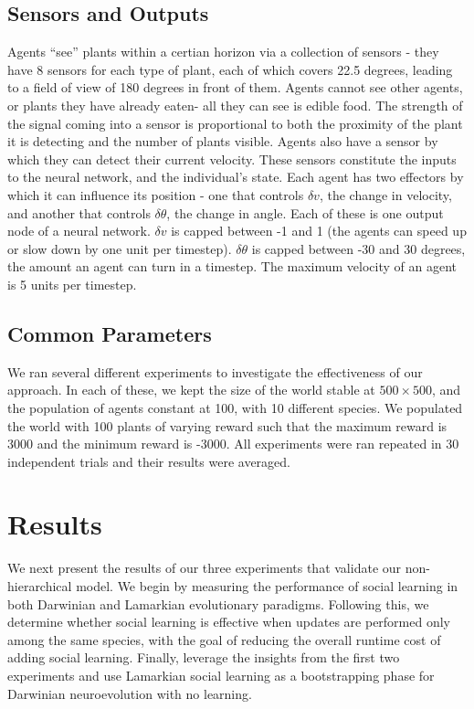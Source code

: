 \documentclass{acm_proc_article-sp}
\begin{document}
\subsection*{Sensors and Outputs} 
  Agents ``see'' plants within a certian horizon via a collection of sensors - they have 8 sensors for each type of plant, each of which covers 22.5 degrees, leading to a field of view of 180 degrees in front of them.  Agents cannot see other agents, or plants they have already eaten- all they can see is edible food.  The strength of the signal coming into a sensor is proportional to both the proximity of the plant it is detecting and the number of plants visible.
   Agents also have a sensor by which they can detect their current velocity. These sensors constitute the inputs to the neural network, and the individual's state. Each agent has two effectors by which it can influence its position - one that controls $\delta v$, the change in velocity, and another that controls $\delta \theta$, the change in angle.
Each of these is one output node of a neural network. $\delta v$ is capped between -1 and 1 (the agents can speed up or slow down by one unit per timestep).  $\delta \theta$ is capped between -30 and 30 degrees, the amount an agent can turn in a timestep.  The maximum velocity of an agent is 5 units per timestep.

\subsection*{Common Parameters} 
We ran several different experiments to investigate the effectiveness of our approach.
In each of these, we kept the size of the world stable at $500\times500$, and the population of agents constant at 100, with 10 different species.
We populated the world with 100 plants of varying reward such that the maximum reward is 3000 and the minimum reward is -3000.
All experiments were ran repeated in 30 independent trials and their results were averaged.

\section{Results}
\label{sec:results}
We next present the results of our three experiments that validate our non-hierarchical model. We begin by measuring the performance of social learning in both Darwinian and Lamarkian evolutionary paradigms. Following this, we determine whether social learning is effective when updates are performed only among the same species, with the goal of reducing the overall runtime cost of adding social learning. Finally, leverage the insights from the first two experiments and use Lamarkian social learning as a bootstrapping phase for Darwinian neuroevolution with no learning.
\end{document}
